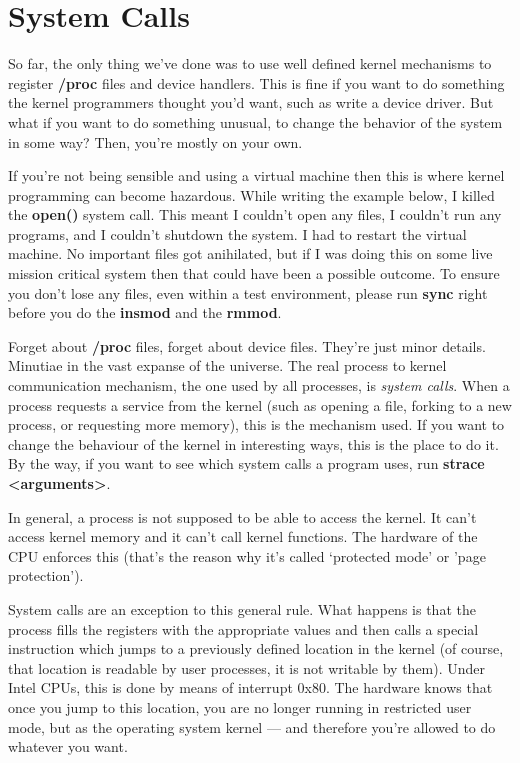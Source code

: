 \documentclass[11pt]{article}
\begin{document}
\section*{System Calls}
\label{sec:org68479ec}
So far, the only thing we've done was to use well defined kernel mechanisms to register \textbf{/proc} files and device handlers. This is fine if you want to do something the kernel programmers thought you'd want, such as write a device driver. But what if you want to do something unusual, to change the behavior of the system in some way? Then, you're mostly on your own.

If you're not being sensible and using a virtual machine then this is where kernel programming can become hazardous. While writing the example below, I killed the \textbf{open()} system call. This meant I couldn't open any files, I couldn't run any programs, and I couldn't shutdown the system. I had to restart the virtual machine. No important files got anihilated, but if I was doing this on some live mission critical system then that could have been a possible outcome. To ensure you don't lose any files, even within a test environment, please run \textbf{sync} right before you do the \textbf{insmod} and the \textbf{rmmod}.

Forget about \textbf{/proc} files, forget about device files. They're just minor details. Minutiae in the vast expanse of the universe. The real process to kernel communication mechanism, the one used by all processes, is \emph{system calls}. When a process requests a service from the kernel (such as opening a file, forking to a new process, or requesting more memory), this is the mechanism used. If you want to change the behaviour of the kernel in interesting ways, this is the place to do it. By the way, if you want to see which system calls a program uses, run \textbf{strace <arguments>}.

In general, a process is not supposed to be able to access the kernel. It can't access kernel memory and it can't call kernel functions. The hardware of the CPU enforces this (that's the reason why it's called `protected mode' or 'page protection').

System calls are an exception to this general rule. What happens is that the process fills the registers with the appropriate values and then calls a special instruction which jumps to a previously defined location in the kernel (of course, that location is readable by user processes, it is not writable by them). Under Intel CPUs, this is done by means of interrupt 0x80. The hardware knows that once you jump to this location, you are no longer running in restricted user mode, but as the operating system kernel --- and therefore you're allowed to do whatever you want.
\end{document}
